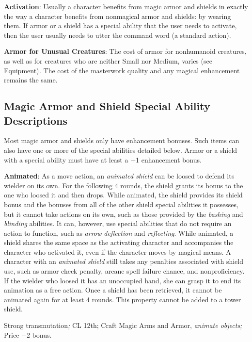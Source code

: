 \textbf{Activation}: Usually a character benefits from magic armor and shields in exactly the way a character benefits from nonmagical armor and shields: by wearing them. If armor or a shield has a special ability that the user needs to activate, then the user usually needs to utter the command word (a standard action).
				
\textbf{Armor for Unusual Creatures}: The cost of armor for nonhumanoid creatures, as well as for creatures who are neither Small nor Medium, varies (see Equipment)\textit{. }The cost of the masterwork quality and any magical enhancement remains the same.
				
\subsection{Magic Armor and Shield Special Ability Descriptions}

				
Most magic armor and shields only have enhancement bonuses. Such items can also have one or more of the special abilities detailed below. Armor or a shield with a special ability must have at least a +1 enhancement bonus.
				
\textbf{Animated}: As a move action, an \textit{animated shield} can be loosed to defend its wielder on its own. For the following 4 rounds, the shield grants its bonus to the one who loosed it and then drops. While animated, the shield provides its shield bonus and the bonuses from all of the other shield special abilities it possesses, but it cannot take actions on its own, such as those provided by the \textit{bashing} and \textit{blinding} abilities. It can, however, use special abilities that do not require an action to function, such as \textit{arrow deflection} and \textit{reflecting}. While animated, a shield shares the same space as the activating character and accompanies the character who activated it, even if the character moves by magical means. A character with an \textit{animated shield} still takes any penalties associated with shield use, such as armor check penalty, arcane spell failure chance, and nonproficiency. If the wielder who loosed it has an unoccupied hand, she can grasp it to end its animation as a free action. Once a shield has been retrieved, it cannot be animated again for at least 4 rounds. This property cannot be added to a tower shield.
				
Strong transmutation\textit{; }CL 12th; Craft Magic Arms and Armor, \textit{animate objects; }Price +2 bonus.
				
